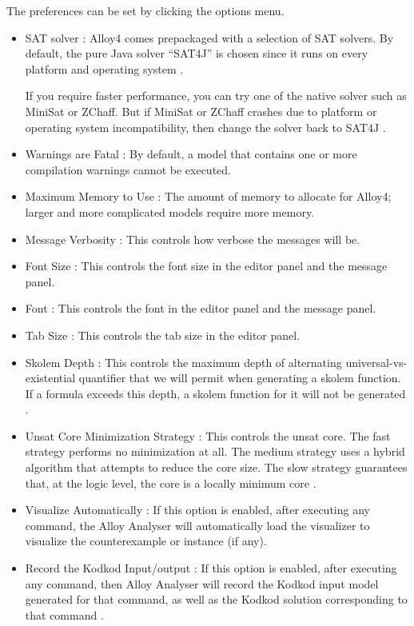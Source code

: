 \documentclass[a4paper,10pt]{report}
\begin{document}
The preferences can be set by clicking the options menu.
\begin{itemize}
\item SAT solver : Alloy4 comes prepackaged with a selection of SAT solvers. By default, the pure Java solver ``SAT4J” is chosen since it runs on every platform and operating system \cite{DanielJackson}.

If you require faster performance, you can try one of the native solver such as MiniSat or ZChaff. But if MiniSat or ZChaff crashes due to platform or operating system incompatibility, then change the solver back to SAT4J \cite{DanielJackson}.

\item Warnings are Fatal : By default, a model that contains one or more compilation warnings cannot be executed.
\item Maximum Memory to Use : The amount of memory to allocate for Alloy4; larger and more complicated models require more memory.
\item Message Verbosity : This controls how verbose the messages will be.
\item Font Size : This controls the font size in the editor panel and the message panel.
\item Font : This controls the font in the editor panel and the message panel.
\item Tab Size : This controls the tab size in the editor panel.
\item Skolem Depth : This controls the maximum depth of alternating universal-vs-existential quantifier that we will permit when generating a skolem function. If a formula exceeds this depth, a skolem function for it will not be generated \cite{DanielJackson}.
\item Unsat Core Minimization Strategy : This controls the unsat core. The fast strategy performs no minimization at all. The medium strategy uses a hybrid algorithm that attempts to reduce the core size. The slow strategy guarantees that, at the logic level, the core is a locally minimum core \cite{DanielJackson}.
\item Visualize Automatically : If this option is enabled, after executing any command, the Alloy Analyser will automatically load the visualizer to visualize the counterexample or instance (if any)\cite{DanielJackson}.
\item Record the Kodkod Input/output : If this option is enabled, after executing any command, then Alloy Analyser will record the Kodkod input model generated for that command, as well as the Kodkod solution corresponding to that command \cite{DanielJackson}.
\end{itemize}
\end{document}
